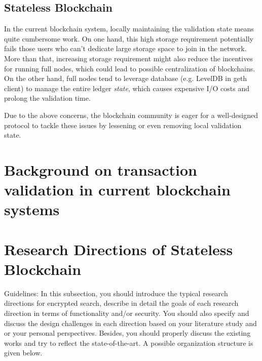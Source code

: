 \documentclass[conference]{IEEEtran}
\begin{document}
\subsection{Stateless Blockchain}
In the current blockchain system, locally maintaining the validation state means quite cumbersome work. 
%
On one hand, this high storage requirement potentially fails those users who can't dedicate large storage space to join in the network.
%
More than that, increasing storage requirement might also reduce the incentives for running full nodes, which could lead to possible centralization of blockchains.
%
On the other hand, full nodes tend to leverage database (e.g. LevelDB in geth client) to manage the entire ledger \textit{state},
which causes expensive I/O costs and prolong the validation time.

Due to the above concerns, the blockchain community is eager for a well-designed protocol to tackle these issues by lessening or even removing local validation state.


\section{Background on transaction validation in current blockchain systems}


\section{Research Directions of Stateless Blockchain}
%

Guidelines: In this subsection, you should introduce the typical research directions for encrypted search, describe in detail the goals of each research direction in terms of functionality and/or security. You should also specify and discuss the design challenges in each direction based on your literature study and or your personal perspectives. Besides, you should properly discuss the existing works and try to reflect the state-of-the-art. A possible organization structure is given below. 
\end{document}
